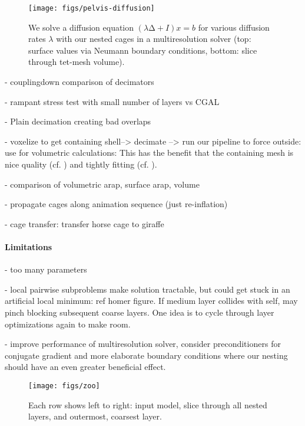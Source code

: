 \begin{figure}
  \texttt{[image: figs/pelvis-diffusion]}
  \caption{We solve a diffusion equation $(λ∆+I) x = b$ for various diffusion
  rates $λ$ with our nested cages in a multiresolution solver (top: surface
  values via Neumann boundary conditions, bottom: slice through tet-mesh
  volume).}
  \label{fig:pelvis-diffusion}
\end{figure}

- couplingdown comparison of decimators

- rampant stress test with small number of layers vs CGAL

- Plain decimation creating bad overlaps

- voxelize to get containing shell--> decimate --> run our pipeline to force
  outside: use for volumetric calculations: This has the benefit that the
  containing mesh is nice quality (cf. \cite{Jacobson:WN:2013}) and tightly
  fitting (cf. \cite{Xu:2014:SDF}).

- comparison of volumetric arap, surface arap, volume

- propagate cages along animation sequence (just re-inflation)

- cage transfer: transfer horse cage to giraffe


\paragraph{Limitations}
%

- too many parameters

- local pairwise subproblems make solution tractable, but could get stuck in an
  artificial local minimum: ref homer figure. If medium layer collides with
  self, may pinch blocking subsequent coarse layers. One idea is to cycle
  through layer optimizations again to make room.

- improve performance of multiresolution solver, consider preconditioners for
  conjugate gradient and more elaborate boundary conditions where our nesting
  should have an even greater beneficial effect.

\begin{figure*}
  \texttt{[image: figs/zoo]}
  \caption{Each row shows left to right: input model, slice through all nested
  layers, and outermost, coarsest layer.}
  \label{fig:zoo}
\end{figure*}
